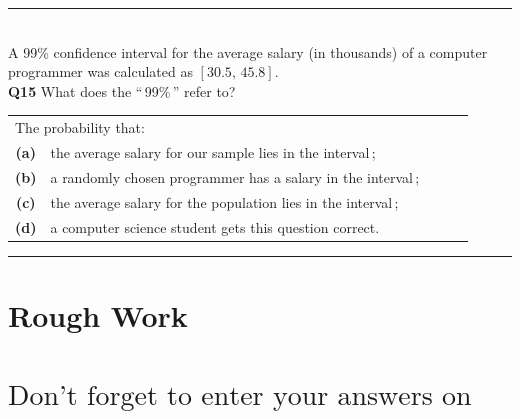 \documentclass[12pt]{article}
\begin{document}
\rule{\linewidth}{1pt}
\quad\\
A 99\% confidence interval for the average salary (in thousands) of a computer programmer was calculated as $[30.5,\,45.8]$.\\[0.2cm]

{\bf Q15} What does the ``\,99\%\,'' refer to?\\[0.4cm]
\begin{tabular}{c@{\,\,\,}llll}
\multicolumn{2}{l}{\quad The probability that:}\\[0.2cm]
{\bf(a)} & the average salary for our sample lies in the interval\,;\\[0.2cm]
{\bf(b)} & a randomly chosen programmer has a salary in the interval\,; \\[0.2cm]
{\bf(c)} & the average salary for the population lies in the interval\,; \\[0.2cm]
{\bf(d)} & a computer science student gets this question correct. \\[0.6cm]
\end{tabular}


\rule{\linewidth}{1pt}







\newpage

\section*{Rough Work\\[23cm]}
\section*{\hspace{2cm}$\boxed{\text{Don't forget to enter your answers on the last page!}}$}

\newpage
\end{document}
